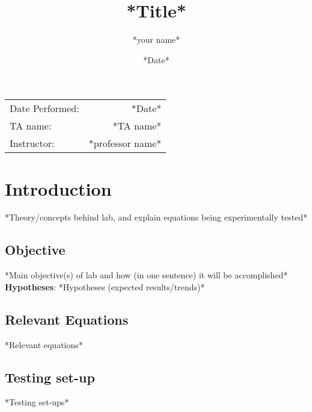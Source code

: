\documentclass[
	letterpaper, %
	10pt, %
]{CSUniSchoolLabReport}
\title{*Title*
} %
\author{*your name*} %
\date{*Date*} %
\begin{document}
\maketitle %

\begin{center}
	\begin{tabular}{l r}
		Date Performed: & *Date* \\ %
		TA name: & *TA name* \\ %
		Instructor: & *professor name* %
	\end{tabular}
\end{center}



\vspace{5in}
\section{Introduction}
*Theory/concepts behind lab, and explain equations being experimentally tested*
\subsection{Objective}
*Main objective(s) of lab and how (in one sentence) it will be accomplished*\\
\textbf{Hypotheses}:
*Hypotheses (expected results/trends)*
\subsection{Relevant Equations}
*Relevant equations*
\subsection{Testing set-up}
*Testing set-ups*
\end{document}
